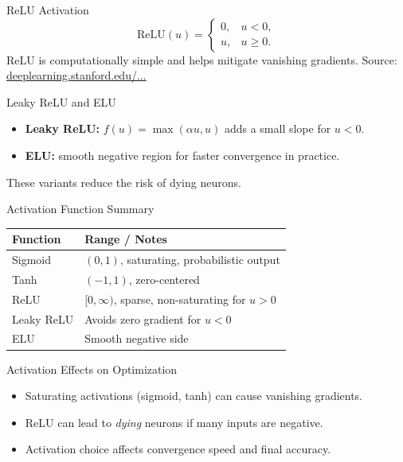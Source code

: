 \documentclass[10pt]{beamer}
\begin{document}
\begin{frame}{ReLU Activation}
  \justifying
  \[
    \mathrm{ReLU}(u)=
    \begin{cases}
      0, & u < 0,\\
      u, & u \ge 0.
    \end{cases}
  \]
  ReLU is computationally simple and helps mitigate vanishing gradients.
  \vspace{0.5em}
  \footnotesize
  Source: \href{http://deeplearning.stanford.edu/tutorial/supervised/MultiLayerNeuralNetworks/}{deeplearning.stanford.edu/...}
\end{frame}

\begin{frame}{Leaky ReLU and ELU}
  \justifying
  \begin{itemize}
    \item \textbf{Leaky ReLU:} $f(u) = \max(\alpha u, u)$ adds a small slope for $u<0$.
    \item \textbf{ELU:} smooth negative region for faster convergence in practice.
  \end{itemize}
  These variants reduce the risk of dying neurons.
\end{frame}

\begin{frame}{Activation Function Summary}
  \justifying
  \begin{table}[ht]
    \centering
    \begin{tabular}{l l}
      \toprule
      \textbf{Function} & \textbf{Range / Notes} \\
      \midrule
      Sigmoid & $(0,1)$, saturating, probabilistic output \\
      Tanh & $(-1,1)$, zero-centered \\
      ReLU & $[0,\infty)$, sparse, non-saturating for $u>0$ \\
      Leaky ReLU & Avoids zero gradient for $u<0$ \\
      ELU & Smooth negative side \\
      \bottomrule
    \end{tabular}
  \end{table}
\end{frame}

\begin{frame}{Activation Effects on Optimization}
  \justifying
  \begin{itemize}
    \item Saturating activations (sigmoid, tanh) can cause vanishing gradients.
    \item ReLU can lead to \textit{dying} neurons if many inputs are negative.
    \item Activation choice affects convergence speed and final accuracy.
  \end{itemize}
\end{frame}
\end{document}
